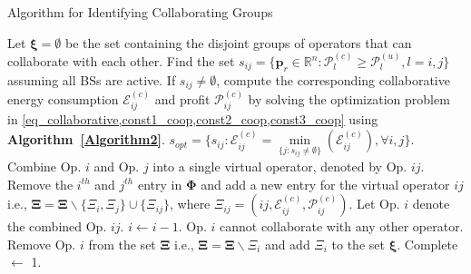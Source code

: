 \documentclass[10pt, letter, twocolumn]{IEEEtran}
\begin{document}
\label{groups}
\begin{algorithm}[t!]
\small
\caption{Algorithm for Identifying Collaborating Groups}
\label{Algorithm_grouping}
\begin{algorithmic}[1]
\STATE Let $\mathbf{\xi} = \emptyset$ be the set containing the disjoint groups of operators that can collaborate with each other.
\STATE Find the set $s_{ij} = \{ \mathbf{p}_{r} \in \mathbb{R}^n : \mathcal{P}_{l}^{(c)} \geq \mathcal{P}_{l}^{(u)}, l = i,j \}$ assuming all BSs are active. If $s_{ij} \neq \emptyset$, compute the corresponding collaborative energy consumption $\mathcal{E}_{ij}^{(c)}$ and profit $\mathcal{P}_{ij}^{(c)}$ by solving the optimization problem in \cref{eq_collaborative,const1_coop,const2_coop,const3_coop} using \textbf{Algorithm~\ref{Algorithm2}}.
\ENDFOR
\STATE $s_{opt} = \{s_{ij} : \mathcal{E}_{ij}^{(c)} = \underset{\{j: s_{ij} \neq \emptyset\} }{\min} (\mathcal{E}_{ij}^{(c)}), \forall i,j \}$.
\STATE Combine Op. $i$ and Op. $j$ into a single virtual operator, denoted by Op. $ij$. Remove the $i^{th}$ and $j^{th}$ entry in $\mathbf{\Phi}$ and add a new entry for the virtual operator $ij$ i.e., $\mathbf{\Xi} =  \mathbf{\Xi} \backslash \{ \Xi_i,\Xi_j\} \cup \{\Xi_{ij}\}$, where $\Xi_{ij} = (ij, \mathcal{E}_{ij}^{(c)}, \mathcal{P}_{ij}^{(c)})$.
\STATE Let Op. $i$ denote the combined Op. $ij$.
\STATE $i \gets i-1$.
\ELSE
\STATE Op. $i$ cannot collaborate with any other operator. Remove Op. $i$ from the set $\mathbf{\Xi}$ i.e., $\mathbf{\Xi} = \mathbf{\Xi} \backslash \Xi_{i}$ and add $\Xi_{i}$ to the set $\mathbf{\xi}$.
\ENDIF
\ENDFOR
{}
\STATE Complete $\gets$ 1.
\ENDIF
\ENDWHILE
\end{algorithmic}
\end{algorithm}
\normalsize
\end{document}
